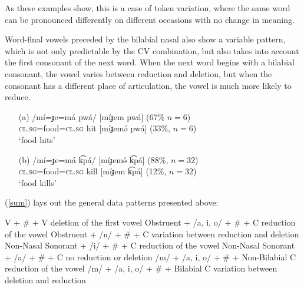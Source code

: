 \documentclass[output=paper,newtxmath,modfonts,nonflat,draftmode]{langsci/langscibook}
\begin{document}
As these examples show, this is a case of token variation, where the same word can be pronounced differently on different occasions with no change in meaning. 

Word-final vowels preceded by the bilabial nasal also show a variable pattern, which is not only predictable by the CV combination, but also takes into account the first consonant of the next word. When the next word begins with a bilabial consonant, the vowel varies between reduction and deletion, but when the consonant has a different place of articulation, the vowel is much more likely to reduce. 

\ea \label{m}
\begin{enumerate}
\item[(a)]
\gll /mí=ɟe=má pwá/ \hspace{0.5cm} [míɟem pwá] (67\% $n=6$)\\
 \textsc{cl.sg}=food=\textsc{cl.sg} hit  \hspace{0.5cm} [míɟemə́ pwá] (33\%, $n=6$)\\ 
\glt `food hits'

\item[(b)] 
\gll /mí=ɟe=má k͡pá/ \hspace{.5cm} [míɟemə́ k͡pá] (88\%, $n=32$)\\
\textsc{cl.sg}=food=\textsc{cl.sg} kill \hspace{0.5cm} [míɟem k͡pá] (12\%, $n=32$)\\
\glt `food kills'

\end{enumerate}
\z

(\ref{sum}) lays out the general data patterns presented above:

\ea \label{sum}

V + \# + V \hfill deletion of the first vowel \newline
Obstruent + /a, i, o/ + \# + C \hfill reduction of the vowel\newline
Obstruent + /u/ + \# + C \hfill variation between reduction and deletion\newline
Non-Nasal Sonorant + /i/ + \# + C \hfill reduction of the vowel\newline
Non-Nasal Sonorant + /a/ + \# + C \hfill no reduction or deletion\newline
/m/ + /a, i, o/ + \# + Non-Bilabial C \hfill reduction of the vowel\newline
/m/ + /a, i, o/ + \# + Bilabial C \hfill variation between deletion and reduction\newline
\end{document}
